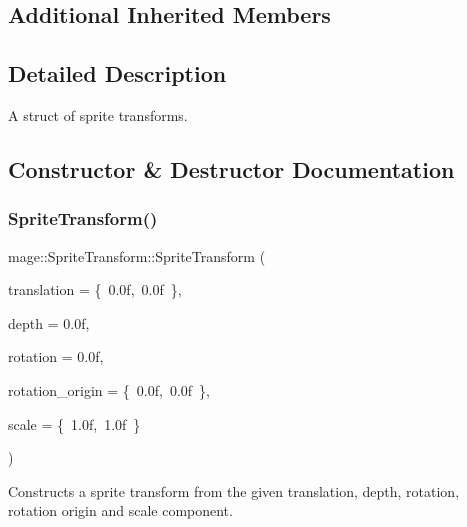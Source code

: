 \subsection*{Additional Inherited Members}


\subsection{Detailed Description}
A struct of sprite transforms. 

\subsection{Constructor \& Destructor Documentation}
\hypertarget{structmage_1_1_sprite_transform_aeffbb76031558a370d653aaed8c00770}{}\label{structmage_1_1_sprite_transform_aeffbb76031558a370d653aaed8c00770} 
\subsubsection{\texorpdfstring{Sprite\+Transform()}{SpriteTransform()}\hspace{0.1cm}{\footnotesize\ttfamily [1/4]}}
{\footnotesize\ttfamily mage\+::\+Sprite\+Transform\+::\+Sprite\+Transform (\begin{DoxyParamCaption}\item[{const X\+M\+F\+L\+O\+A\+T2 \&}]{translation = {\ttfamily \{~0.0f,~0.0f~\}},  }\item[{\hyperlink{namespacemage_aa97e833b45f06d60a0a9c4fc22ae02c0}{F32}}]{depth = {\ttfamily 0.0f},  }\item[{\hyperlink{namespacemage_aa97e833b45f06d60a0a9c4fc22ae02c0}{F32}}]{rotation = {\ttfamily 0.0f},  }\item[{const X\+M\+F\+L\+O\+A\+T2 \&}]{rotation\+\_\+origin = {\ttfamily \{~0.0f,~0.0f~\}},  }\item[{const X\+M\+F\+L\+O\+A\+T2 \&}]{scale = {\ttfamily \{~1.0f,~1.0f~\}} }\end{DoxyParamCaption})\hspace{0.3cm}{\ttfamily [explicit]}}

Constructs a sprite transform from the given translation, depth, rotation, rotation origin and scale component.


